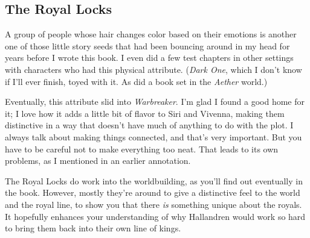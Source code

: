 \subsection*{The Royal Locks}

A group of people whose hair changes color based on their emotions is another one of those little story seeds that had been bouncing around in my head for years before I wrote this book. I even did a few test chapters in other settings with characters who had this physical attribute. (\textit{Dark One}, which I don’t know if I’ll ever finish, toyed with it. As did a book set in the \textit{Aether} world.)

Eventually, this attribute slid into \textit{Warbreaker}. I’m glad I found a good home for it; I love how it adds a little bit of flavor to Siri and Vivenna, making them distinctive in a way that doesn’t have much of anything to do with the plot. I always talk about making things connected, and that’s very important. But you have to be careful not to make everything too neat. That leads to its own problems, as I mentioned in an earlier annotation.

The Royal Locks do work into the worldbuilding, as you’ll find out eventually in the book. However, mostly they’re around to give a distinctive feel to the world and the royal line, to show you that there \textit{is} something unique about the royals. It hopefully enhances your understanding of why Hallandren would work so hard to bring them back into their own line of kings.




